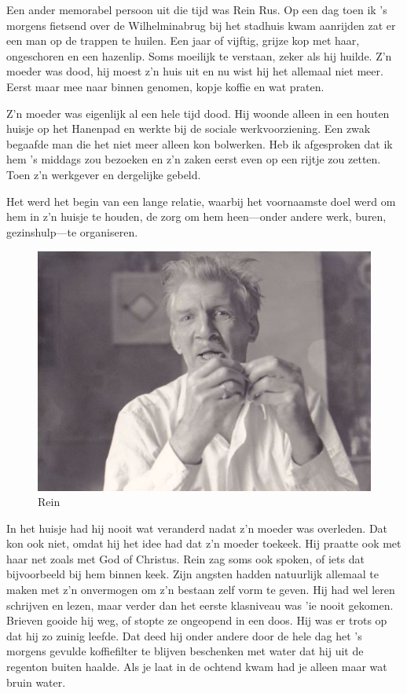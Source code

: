 \documentclass[10pt,twoside, openright]{memoir}
\begin{document}
Een ander memorabel persoon uit die tijd was Rein Rus. Op een dag toen ik ’s morgens fietsend over de Wilhelminabrug bij het stadhuis kwam aanrijden zat er een man op de trappen te huilen. Een jaar of vijftig, grijze kop met haar, ongeschoren en een hazenlip. Soms moeilijk te verstaan, zeker als hij huilde. Z’n moeder was dood, hij moest z’n huis uit en nu wist hij het allemaal niet meer. Eerst maar mee naar binnen genomen, kopje koffie en wat praten. 

Z’n moeder was eigenlijk al een hele tijd dood. Hij woonde alleen in een houten huisje op het Hanenpad en werkte bij de sociale werkvoorziening. Een zwak begaafde man die het niet meer alleen kon bolwerken. Heb ik afgesproken dat ik hem ’s middags zou bezoeken en z’n zaken eerst even op een rijtje zou zetten. Toen z'n werkgever en dergelijke gebeld. 

Het werd het begin van een lange relatie, waarbij het voornaamste doel werd om hem in z’n huisje te houden, de zorg om hem heen---onder andere werk, buren, gezinshulp---te organiseren. 

\begin{figure}
\includegraphics[width=\textwidth]{img/259ReinRus.JPG}
\caption*{\footnotesize Rein}
\end{figure}

In het huisje had hij nooit wat veranderd nadat z’n moeder was overleden. Dat kon ook niet, omdat hij het idee had dat z’n moeder toekeek. Hij praatte ook met haar net zoals met God of Christus. Rein zag soms ook spoken, of iets dat bijvoorbeeld bij hem binnen keek. Zijn angsten hadden natuurlijk allemaal te maken met z’n onvermogen om z’n bestaan zelf vorm te geven. Hij had wel leren schrijven en lezen, maar verder dan het eerste klasniveau was 'ie nooit gekomen. Brieven gooide hij weg, of stopte ze ongeopend in een doos. Hij was er trots op dat hij zo zuinig leefde. Dat deed hij onder andere door de hele dag het ’s morgens gevulde koffiefilter te blijven beschenken met water dat hij uit de regenton buiten haalde. Als je laat in de ochtend kwam had je alleen maar wat bruin water. 
\end{document}
